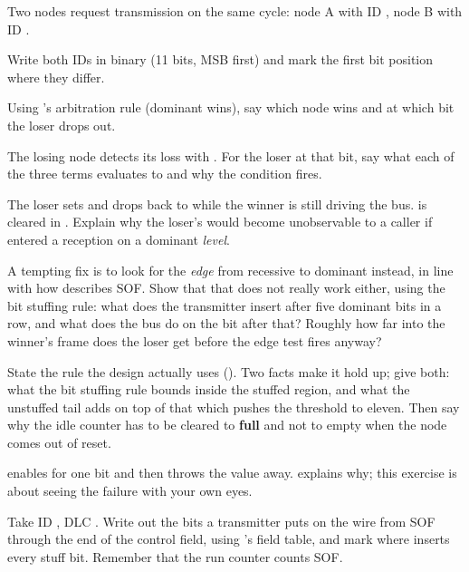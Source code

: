 \label{c17:ex:arbhand}
Two nodes request transmission on the same cycle: node A with ID , node B with ID
.

 Write both IDs in binary (11 bits, MSB first) and mark the first bit position where they
differ.

 Using 's arbitration rule (dominant  wins), say which
node wins and at which bit the loser drops out.

 The losing node detects its loss with
. For the loser at that bit, say what
each of the three terms evaluates to and why the condition fires.

 The loser sets  and drops back to  while the winner is
still driving the bus.  is cleared in . Explain why the loser's
 would become unobservable to a caller if  entered a reception on a
dominant \emph{level}.

 A tempting fix is to look for the \emph{edge} from recessive to dominant instead, in line
with how  describes SOF. Show that that does not really work either,
using the bit stuffing rule: what does the transmitter insert after five dominant bits in a row, and
what does the bus do on the bit after that? Roughly how far into the winner's frame does the loser get
before the edge test fires anyway?

 State the rule the design actually uses (). Two facts make it hold up;
give both: what the bit stuffing rule bounds inside the stuffed region, and what the unstuffed tail
adds on top of that which pushes the threshold to eleven. Then say why the idle counter has to be
cleared to \textbf{full} and not to empty when the node comes out of reset.

\label{c17:ex:sof}
 enables  for one bit and then throws the value away.
 explains why; this exercise is about seeing the failure with your own eyes.

 Take ID , DLC . Write out the bits a transmitter puts on the wire from
SOF through the end of the control field, using 's field table, and mark where
 inserts every stuff bit. Remember that the run counter counts SOF.

